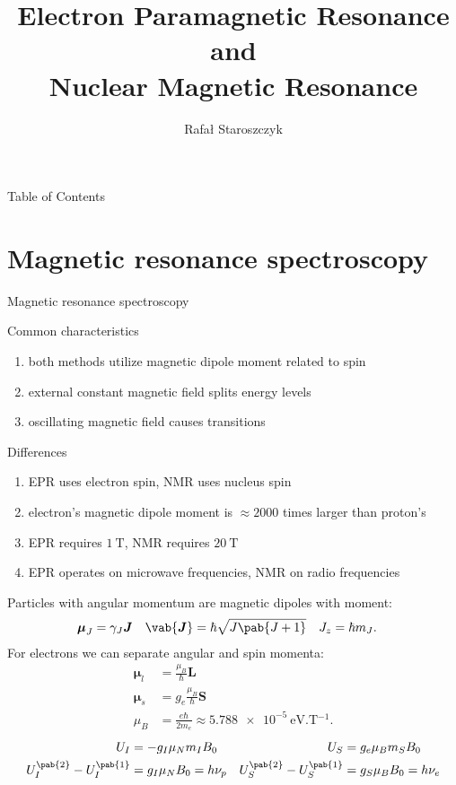 \documentclass[xcolor]{beamer}
\title{Electron Paramagnetic Resonance \\ and \\ Nuclear Magnetic Resonance}
\author{Rafał Staroszczyk}
\date{}
\newcommand\vb[1]{\boldsymbol{#1}}
\begin{document}
\maketitle
\begin{frame}{Table of Contents}
\tableofcontents
\end{frame}

\section{Magnetic resonance spectroscopy}
\begin{frame}{Magnetic resonance spectroscopy}
\begin{block}{Common characteristics}
	\begin{enumerate}
		\item both methods utilize magnetic dipole moment related to spin
		\item external constant magnetic field splits energy levels
		\item oscillating magnetic field causes transitions
	\end{enumerate}
\end{block}

\begin{block}{Differences}
	\begin{enumerate}
		\item EPR uses electron spin, NMR uses nucleus spin
		\item electron's magnetic dipole moment is $\approx 2000$ times larger than proton's
		\item EPR requires $\qty{1}{\tesla}$, NMR requires $\qty{20}{\tesla}$
		\item EPR operates on microwave frequencies, NMR on radio frequencies
	\end{enumerate}
\end{block}
\end{frame}

\begin{frame}
	Particles with angular momentum are magnetic dipoles with moment:
	\begin{align*}
		\vb{\mu}_{J} &= \gamma_{J} \vb{J} & \vab{\vb{J}} &= \hbar\sqrt{J\pab{J+1}} & J_{z} &= \hbar m_{J}.
	\end{align*}
	For electrons we can separate angular and spin momenta:
	\begin{align*}
		\vb{\mu}_{l} &= \frac{\mu_B}{\hbar} \vb{L} \\
		\vb{\mu}_{s} &= g_e\frac{\mu_B}{\hbar} \vb{S} \\
		\mu_B &= \frac{e\hbar}{2 m_e} \approx \qty{5.788e-5}{\eV.\tesla^{-1}}.
	\end{align*}
	\begin{align*}
		U_{I} &= -g_{I}\mu_{N}m_{I}B_{0} & U_{S} &= g_{e}\mu_{B}m_{S}B_{0} \\
		U_{I}^{\pab{2}} - U_{I}^{\pab{1}} &= g_{I}\mu_{N}B_{0} = h\nu_{p} & U_{S}^{\pab{2}} - U_{S}^{\pab{1}} &= g_{S}\mu_{B}B_{0} = h\nu_{e}
	\end{align*}
\end{frame}
\end{document}
